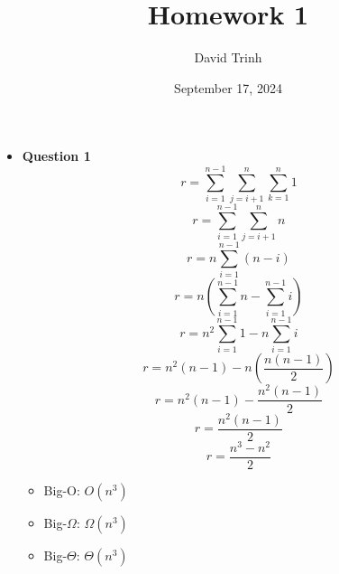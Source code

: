 \documentclass{article}
\title{Homework 1}
\author{David Trinh}
\date{September 17, 2024}
\begin{document}
\maketitle

\begin{itemize}

    \item\textbf{ Question 1}
        \begin{equation}
            r=\sum^{n-1}_{i=1} \sum^{n}_{j=i+1} \sum^{n}_{k=1} 1
        \end{equation}
        \begin{equation}
            r=\sum^{n-1}_{i=1} \sum^{n}_{j=i+1} n
        \end{equation}
        \begin{equation}
            r=n\sum^{n-1}_{i=1} (n-i)
        \end{equation}
        \begin{equation}
            r=n\left(\sum^{n-1}_{i=1} n - \sum^{n-1}_{i=1} i \right)
        \end{equation}
        \begin{equation}
            r=n^2\sum^{n-1}_{i=1} 1 - n\sum^{n-1}_{i=1} i
        \end{equation}
        \begin{equation}
            r=n^2(n-1) - n\left(\frac{n(n-1)}{2}\right)
        \end{equation}
        \begin{equation}
            r=n^2(n-1) - \frac{n^2(n-1)}{2}
        \end{equation}
        \begin{equation}
            r=\frac{n^2(n-1)}{2}
        \end{equation}
        \begin{equation}
            r=\frac{n^3-n^2}{2}
        \end{equation}
        \begin{itemize}
            \item[] Big-O: $O(n^3)$
            \item[] Big-$\Omega$: $\Omega(n^3)$
            \item[] Big-$\Theta$: $\Theta(n^3)$
        \end{itemize}



\end{itemize}
\end{document}
